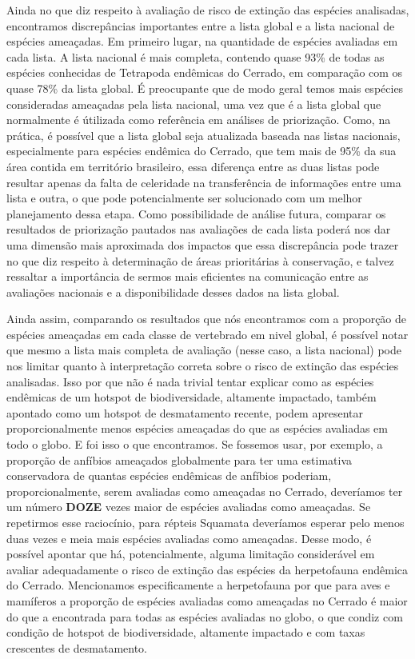 \documentclass[12pt,openright,oneside,a4paper,english]{abntex2}
\begin{document}
Ainda no que diz respeito à avaliação de risco de extinção das espécies analisadas, encontramos discrepâncias importantes entre a lista global e a lista nacional de espécies ameaçadas. Em primeiro lugar, na quantidade de espécies avaliadas em cada lista. A lista nacional é mais completa, contendo quase 93\% de todas as espécies conhecidas de Tetrapoda endêmicas do Cerrado, em comparação com os quase 78\% da lista global. É preocupante que de modo geral temos mais espécies consideradas ameaçadas pela lista nacional, uma vez que é a lista global que normalmente é útilizada como referência em análises de priorização. Como, na prática, é possível que a lista global seja atualizada baseada nas listas nacionais, especialmente para espécies endêmica do Cerrado, que tem mais de 95\% da sua área contida em território brasileiro, essa diferença entre as duas listas pode resultar apenas da falta de celeridade na transferência de informações entre uma lista e outra, o que pode potencialmente ser solucionado com um melhor planejamento dessa etapa. Como possibilidade de análise futura, comparar os resultados de priorização pautados nas avaliações de cada lista poderá nos dar uma dimensão mais aproximada dos impactos que essa discrepância pode trazer no que diz respeito à determinação de áreas prioritárias à conservação, e talvez ressaltar a importância de sermos mais eficientes na comunicação entre as avaliações nacionais e a disponibilidade desses dados na lista global.

Ainda assim, comparando os resultados que nós encontramos com a proporção de espécies ameaçadas em cada classe de vertebrado em nivel global, é possível notar que mesmo a lista mais completa de avaliação (nesse caso, a lista nacional) pode nos limitar quanto à interpretação correta sobre o risco de extinção das espécies analisadas. Isso por que não é nada trivial tentar explicar como as espécies endêmicas de um hotspot de biodiversidade, altamente impactado, também apontado como um hotspot de desmatamento recente, podem apresentar proporcionalmente menos espécies ameaçadas do que as espécies avaliadas em todo o globo. E foi isso o que encontramos. Se fossemos usar, por exemplo, a proporção de anfíbios ameaçados globalmente para ter uma estimativa conservadora de quantas espécies endêmicas de anfíbios poderiam, proporcionalmente, serem avaliadas como ameaçadas no Cerrado, deveríamos ter um número \textbf{DOZE} vezes maior de espécies avaliadas como ameaçadas. Se repetirmos esse raciocínio, para répteis Squamata deveríamos esperar pelo menos duas vezes e meia mais espécies avaliadas como ameaçadas. Desse modo, é possível apontar que há, potencialmente, alguma limitação considerável em avaliar adequadamente o risco de extinção das espécies da herpetofauna endêmica do Cerrado. Mencionamos especificamente a herpetofauna por que para aves e mamíferos a proporção de espécies avaliadas como ameaçadas no Cerrado é maior do que a encontrada para todas as espécies avaliadas no globo, o que condiz com condição de hotspot de biodiversidade, altamente impactado e com taxas crescentes de desmatamento.
\end{document}
